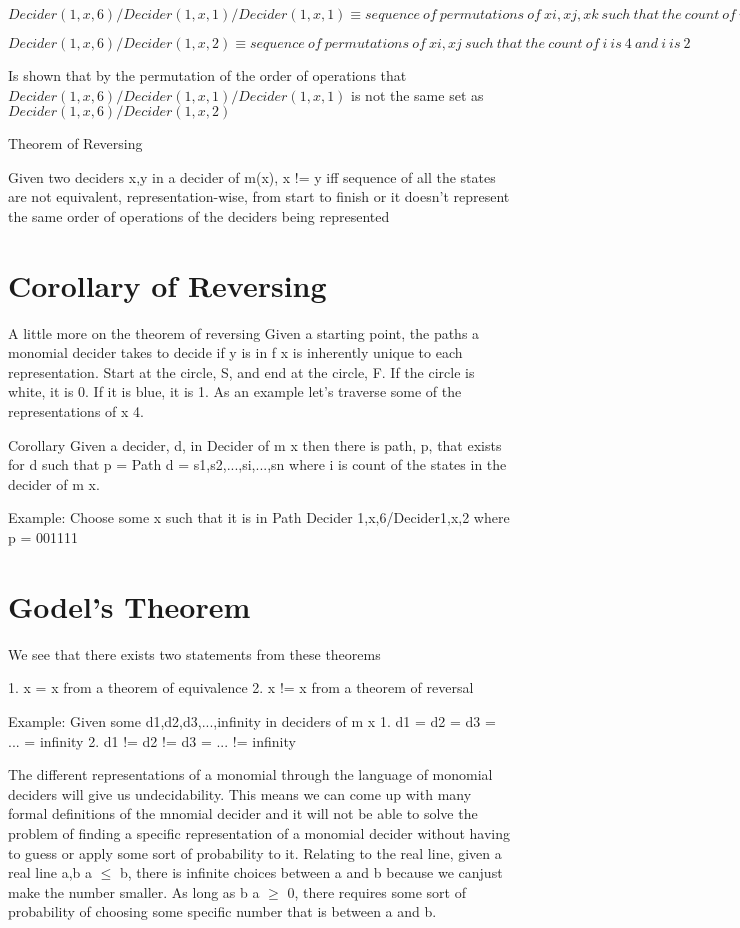 $Decider(1,x,6)/Decider(1,x,1)/Decider(1,x,1) \equiv {sequence\ of\ permutations\ of\ {xi,xj,xk}\ such\ that\ the\ count\ of\ i\ is\ 4\ and\ j\ is\ 1\ and\ k\ 1}$

$Decider(1,x,6)/Decider(1,x,2) \equiv {sequence\ of\ permutations\ of\ {xi,xj}\ such\ that\ the\ count\ of\ i\ is\ 4\ and\ i\ is\ 2}$

Is shown that by the permutation of the order of operations that $Decider(1,x,6)/Decider(1,x,1)/Decider(1,x,1)$ is not the same set as $Decider(1,x,6)/Decider(1,x,2)$

Theorem of Reversing

Given two deciders x,y in a decider of m(x), x != y iff sequence of all the states are not equivalent, representation-wise, from start to finish or it doesn't represent the same order of operations of the deciders being represented

\section{Corollary of Reversing}

A little more on the theorem of reversing
Given a starting point, the paths a monomial decider takes to decide if y is in f x is inherently unique to each representation. Start at the circle, S, and end at the circle, F. If the circle is white, it is 0. If it is blue, it is 1. As an example let's traverse some of the representations of x 4.

Corollary
Given a decider, d, in Decider of m x then there is path, p, that exists for d such that p = Path d = s1,s2,...,si,...,sn where i is count of the states in the decider of m x.

Example:
Choose some x such that it is in Path Decider 1,x,6/Decider1,x,2 where p = 001111

\section{Godel's Theorem}

We see that there exists two statements from these theorems

1. x = x from a theorem of equivalence
2. x != x from a theorem of reversal


Example:
Given some d1,d2,d3,...,infinity in deciders of m x
1. d1 = d2 = d3 = ... = infinity
2. d1 != d2 != d3 = ... != infinity

The different representations of a monomial through the language of monomial deciders will give us undecidability. This means we can come up with many formal definitions of the mnomial decider and it will not be able to solve the problem of finding a specific representation of a monomial decider without having to guess or apply some sort of probability to it. Relating to the real line, given a real line a,b a $\leq$ b, there is infinite choices between a and b because we canjust make the number smaller. As long as b  a $\geq $ 0, there requires some sort of probability of choosing some specific number that is between a and b.

